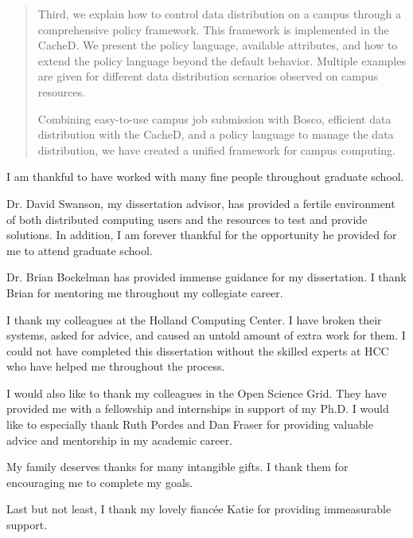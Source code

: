 \documentclass[print,phd]{nuthesis}
\begin{document}
\begin{abstract}
Third, we explain how to control data distribution on a campus through a comprehensive policy framework.  This framework is implemented in the CacheD.  We present the policy language, available attributes, and how to extend the policy language beyond the default behavior.  Multiple examples are given for different data distribution scenarios observed on campus resources.   

Combining easy-to-use campus job submission with Bosco, efficient data distribution with the CacheD, and a policy language to manage the data distribution, we have created a unified framework for campus computing.


\end{abstract}



\begin{acknowledgments}
I am thankful to have worked with many fine people throughout graduate school.

Dr. David Swanson, my dissertation advisor, has provided a fertile environment of both distributed computing users and the resources to test and provide solutions.  In addition, I am forever thankful for the opportunity he provided for me to attend graduate school.

Dr. Brian Bockelman has provided immense guidance for my dissertation.  I thank Brian for mentoring me throughout my collegiate career.

I thank my colleagues at the Holland Computing Center.  I have broken their systems, asked for advice, and caused an untold amount of extra work for them.  I could not have completed this dissertation without the skilled experts at HCC who have helped me throughout the process.

I would also like to thank my colleagues in the Open Science Grid.  They have provided me with a fellowship and internships in support of my Ph.D.  I would like to especially thank Ruth Pordes and Dan Fraser for providing valuable advice and mentorship in my academic career.

My family deserves thanks for many intangible gifts.  I thank them for encouraging me to complete my goals.

Last but not least, I thank my lovely fianc\'ee Katie for providing immeasurable support. 

\end{acknowledgments}
\end{document}

